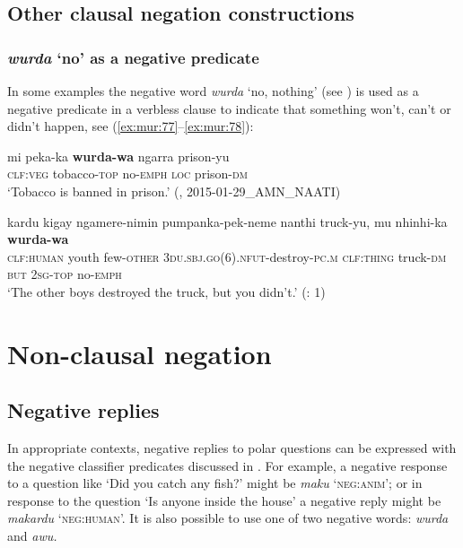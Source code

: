\documentclass[output=paper,colorlinks,citecolor=brown]{langscibook}
\begin{document}
\subsection{Other clausal negation constructions} \label{sec:mur:2.6}
\subsubsection{\textit{wurda} ‘no’ as a negative predicate} \label{sec:mur:2.6.1}

In some examples the negative word \textit{wurda} ‘no, nothing’ (see ) is used as a negative predicate in a verbless clause to indicate that something won’t, can’t or didn’t happen, see (\ref{ex:mur:77}--\ref{ex:mur:78}): 

\ea\label{ex:mur:77}
    \gll  mi peka-ka \textbf{wurda-wa} ngarra prison-yu\\
         \textsc{clf:veg} tobacco-\textsc{top} no-\textsc{emph} \textsc{loc} prison-\textsc{dm}\\
    \glt ‘Tobacco is banned in prison.’ (\citealt{MansfieldEtAl2019}, 2015-01-29\_AMN\_NAATI)
\z 

\ea\label{ex:mur:78}
    \gll kardu kigay ngamere-nimin pumpanka-pek-neme nanthi truck-yu, mu nhinhi-ka \textbf{wurda-wa}\\
         \textsc{clf:human} youth few-\textsc{other} \textsc{3du.sbj.go(6).nfut-}destroy\textsc{{}-pc.m} \textsc{clf:thing} truck-\textsc{dm} \textsc{but} \textsc{2sg-top} no\textsc{{}-emph}\\
    \glt ‘The other boys destroyed the truck, but you didn’t.’ (\citealt{FordMcCormack2011}: 1)
\z 
          

\section{Non-clausal negation} \label{sec:mur:3}
\subsection{Negative replies} \label{sec:mur:3.1}

In appropriate contexts, negative replies to polar questions can be expressed with the negative classifier predicates discussed in . For example, a negative response to a question like ‘Did you catch any fish?’ might be \textit{maku} ‘\textsc{neg:anim}’; or in response to the question ‘Is anyone inside the house’ a negative reply might be \textit{makardu} ‘\textsc{neg:human}’. It is also possible to use one of two negative words: \textit{wurda} and \textit{awu.} 
\end{document}
